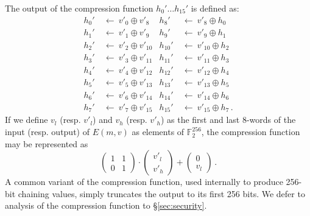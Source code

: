 \documentclass[11pt,notitlepage,a4paper]{article}
\begin{document}
The output of the compression function $h_{0}' \ldots h_{15}'$ is
defined as:
\begin{align*}
h_{0}'  \ & \leftarrow \ v'_{0} \oplus  v'_{8} &
h_{8}'  \ & \leftarrow \ v'_{8} \oplus  h_{0} \\
h_{1}'  \ & \leftarrow \ v'_{1} \oplus  v'_{9} &
h_{9}'  \ & \leftarrow \ v'_{9} \oplus  h_{1} \\
h_{2}'  \ & \leftarrow \ v'_{2} \oplus  v'_{10} &
h_{10}' \ & \leftarrow \ v'_{10} \oplus  h_{2} \\
h_{3}'  \ & \leftarrow \ v'_{3} \oplus  v'_{11} &
h_{11}' \ & \leftarrow \ v'_{11} \oplus  h_{3} \\
h_{4}'  \ & \leftarrow \ v'_{4} \oplus  v'_{12} &
h_{12}' \ & \leftarrow \ v'_{12} \oplus  h_{4} \\
h_{5}'  \ & \leftarrow \ v'_{5} \oplus  v'_{13} &
h_{13}' \ & \leftarrow \ v'_{13} \oplus  h_{5} \\
h_{6}'  \ & \leftarrow \ v'_{6} \oplus  v'_{14} &
h_{14}' \ & \leftarrow \ v'_{14} \oplus  h_{6} \\
h_{7}'  \ & \leftarrow \ v'_{7} \oplus  v'_{15} &
h_{15}' \ & \leftarrow \ v'_{15} \oplus  h_{7}\,.
\end{align*}
If we define $v_l$ (resp. $v'_l$) and $v_h$ (resp. $v'_h$) as the first and last 8-words of the input (resp. output) of $E(m, v)$ as elements of $\mathbb{F}_2^{256}$, the compression function may be represented as 
\[
  \begin{pmatrix}
    1 & 1 \\
    0 & 1
  \end{pmatrix}\cdot%
  \begin{pmatrix}
  v'_l \\ v'_h
  \end{pmatrix} + 
  \begin{pmatrix}
   0 \\ v_l
  \end{pmatrix}\,.
\]
A common variant of the compression function, used internally to produce 256-bit chaining values, simply truncates the output to its first 256 bits. We defer to analysis of the compression function to \S\ref{sec:security}.
\end{document}

